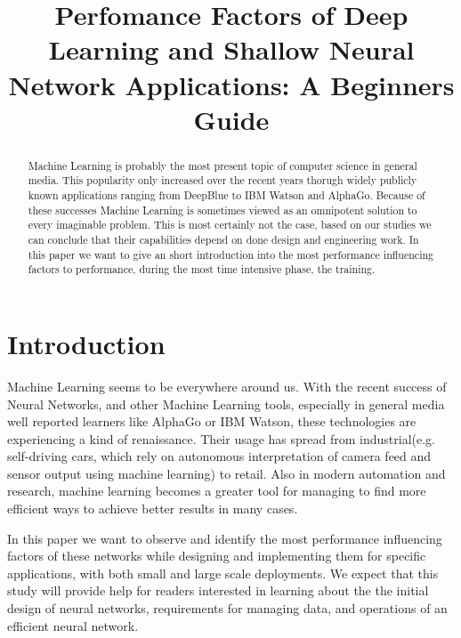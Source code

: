\documentclass[conference]{IEEEtran}
\begin{document}
\title{
Perfomance Factors of Deep Learning and Shallow Neural Network Applications: A Beginners Guide
}

\author{
}

\maketitle

\begin{abstract}

Machine Learning is probably the most present topic of computer science in general media. This popularity only increased over the recent years thorugh widely publicly known applications ranging from DeepBlue to IBM Watson and AlphaGo. Because of these successes Machine Learning is sometimes viewed as an omnipotent solution to every imaginable problem. This is most certainly not the case, based on our studies we can conclude that their capabilities depend on done design and engineering work. In this paper we want to give an short introduction into the most performance influencing factors to performance, during the most time intensive phase, the training.

\end{abstract}

\IEEEpeerreviewmaketitle
\section{Introduction}
Machine Learning seems to be everywhere around us. With the recent success of Neural Networks, and other Machine Learning tools, especially  in general media well reported learners like AlphaGo or IBM Watson, these technologies are experiencing a kind of renaissance. Their usage has spread from industrial(e.g. self-driving cars, which rely on autonomous interpretation of camera feed and sensor output using machine learning) to retail. Also in modern automation and research, machine learning becomes a greater tool for managing to find more efficient ways to achieve better results in many cases.

In this paper we want to observe and identify the most performance influencing factors of these networks while designing and implementing them for specific applications, with both small and large scale deployments.
We expect that this study will provide help for readers interested in learning about the the initial design of neural networks, requirements for managing data, and operations of an efficient neural network.
\end{document}

